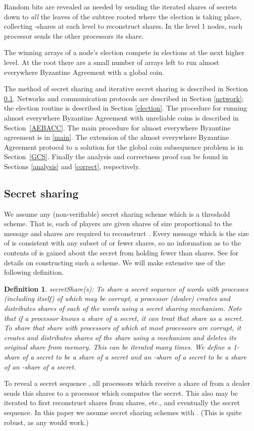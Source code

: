 \documentclass[letterpaper,11pt]{article}
\newtheorem{definition}{Definition}
\begin{document}
 Random bits are revealed as needed by sending the iterated shares of secrets down to {\it all}  the leaves of the subtree rooted where the election is taking place, collecting -shares at each level  to reconstruct  shares.  In the level 1 nodes, each processor sends the other processors its share.

The winning arrays of a node's election compete in elections at the next higher level.
At the root there are a small number of arrays left to run almost everywhere Byzantine Agreement with a global coin.

The method of secret sharing and iterative secret sharing is described in Section \ref{secretsharing}.
Networks and communication protocols are described in Section \ref{network}; the election routine is described in Section \ref{election}.
The procedure for running almost everywhere Byzantine Agreement with unreliable coins is described in Section~\ref{AEBACC}.  The main procedure for almost everywhere Byzantine agreement is in \ref{main}.  The extension of the almost everywhere Byzantine Agreement protocol to a solution for  the global coin subsequence problem is in Section~\ref{GCS}.  Finally the analysis and correctness proof can be found in Sections \ref{analysis} and \ref{correct}, respectively.



\subsection{Secret sharing} \label{secretsharing}

We assume any (non-verifiable) secret sharing scheme which is a   threshold scheme. That is, each of  players are given shares of size
proportional to the message  and  shares are required to reconstruct . Every message which is the size of  is consistent with any subset of  or fewer shares, so no information as to the contents of  is gained about the secret from holding fewer than  shares. See \cite{crypto} for details on constructing such a scheme.  We will make extensive use of the following definition.

\begin{definition}
{\it secretShare(s)}:   To share a secret sequence of words  with  processes (including itself)  of which  may be corrupt, a processor (dealer) creates and distributes shares of each of the words using a  secret sharing mechanism. 
Note that if a processor knows a share of a secret, it can treat that share as a secret. To share that share with   processors of which at most  processors are corrupt,  it creates and  distributes shares of the share
using a  mechanism and deletes its original share from memory. This can be iterated many times.
We define a {\it 1-share} of a secret to be a share of a secret and an {\it -share} of a secret to be a share of an -share of a secret.
\end{definition}
To reveal a secret sequence , all processors which receive a share of  from a dealer sends this shares to a processor   which computes the secret. This also may be iterated to first reconstruct   shares from  shares, etc.,  and eventually the secret sequence. 
In this paper we assume secret sharing schemes with . (This is quite robust, as any  would work.)
\end{document}
